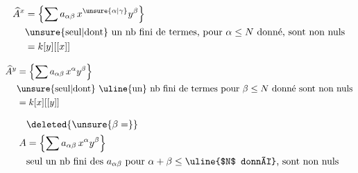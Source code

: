 \[
\begin{aligned}
\widehat A^{x}&=\left\{\sum a_{\alpha\beta}\,x^{\unsure{\alpha|\gamma}}y^\beta\right\}\\
&\text{\unsure{seul|dont} un nb fini de termes, pour $\alpha\leq N$ donné, sont non nuls}\\
&=k[y][[x]]
\end{aligned}
\]

\[
\begin{aligned}
\widehat A^y&=\left\{\sum a_{\alpha\beta}\,x^\alpha y^\beta\right\}\\
&\text{\unsure{seul|dont} \uline{un} nb fini de termes pour $\beta\leq N$ donné sont non nuls}\\
&=k[x][[y]]
\end{aligned}
\]

\[
\begin{aligned}
&\deleted{\unsure{\beta=}}\\
A&=\left\{\sum a_{\alpha\beta}\,x^\alpha y^\beta\right\}\\
&\text{seul un nb fini des $a_{\alpha\beta}$ pour $\alpha+\beta\leq{}$\uline{$N$ donné}, sont non nuls}
\end{aligned}
\]
